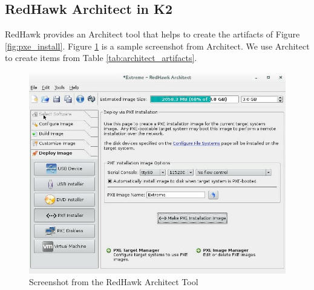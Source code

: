 \documentclass[12pt]{article}
\begin{document}
%
\subsection{RedHawk Architect in K2}
RedHawk provides an Architect tool that helps to create the artifacts of Figure
\ref{fig:pxe_install}. Figure \ref{fig:architect_screenshot} is a sample
screenshot from Architect.  We use Architect to create items from Table
\ref{tab:architect_artifacts}.

\begin{table}[H]
    \captionsetup{width=1.0\linewidth}
    \caption{Artifacts created with RedHawk Architect}
    \label{tab:architect_artifacts}
\end{table}

\begin{figure}[H]
    \begin{center}
    \includegraphics[width=1.0\textwidth]{img/architect_screenshot}
    \caption{Screenshot from the RedHawk Architect Tool}
    \label{fig:architect_screenshot}
    \end{center}
\end{figure}
\end{document}
